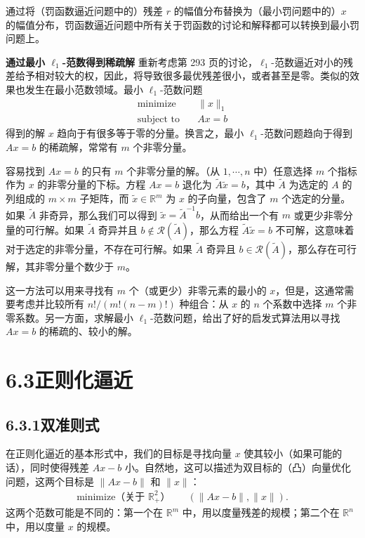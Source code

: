 \documentclass[UTF8,12pt,a4paper,fontset=fandol]{ctexart}
\begin{document}
通过将（罚函数逼近问题中的）残差 $r$ 的幅值分布替换为（最小罚问题中的）$x$ 的幅值分布，罚函数逼近问题中所有关于罚函数的讨论和解释都可以转换到最小罚问题上。

\noindent\textbf{通过最小 $\ell_1$-范数得到稀疏解}\quad
重新考虑第 293 页的讨论，$\ell_1$-范数逼近对小的残差给予相对较大的权，因此，将导致很多最优残差很小，或者甚至是零。类似的效果也发生在最小范数领域。最小 $\ell_1$-范数问题
\[
\begin{aligned}
\text{minimize}\quad & \|x\|_1\\
\text{subject to}\quad & Ax=b
\end{aligned}
\]
得到的解 $x$ 趋向于有很多等于零的分量。换言之，最小 $\ell_1$-范数问题趋向于得到 $Ax=b$ 的稀疏解，常常有 $m$ 个非零分量。

容易找到 $Ax=b$ 的只有 $m$ 个非零分量的解。（从 $1,\cdots,n$ 中）任意选择 $m$ 个指标作为 $x$ 的非零分量的下标。方程 $Ax=b$ 退化为 $\tilde{A}\tilde{x}=b$，其中 $\tilde{A}$ 为选定的 $A$ 的列组成的 $m\times m$ 子矩阵，而 $\tilde{x}\in\mathbb{R}^m$ 为 $x$ 的子向量，包含了 $m$ 个选定的分量。如果 $\tilde{A}$ 非奇异，那么我们可以得到 $\tilde{x}=\tilde{A}^{-1}b$，从而给出一个有 $m$ 或更少非零分量的可行解。如果 $\tilde{A}$ 奇异并且 $b\notin\mathcal{R}(\tilde{A})$，那么方程 $\tilde{A}\tilde{x}=b$ 不可解，这意味着对于选定的非零分量，不存在可行解。如果 $\tilde{A}$ 奇异且 $b\in\mathcal{R}(\tilde{A})$，那么存在可行解，其非零分量个数少于 $m$。

这一方法可以用来寻找有 $m$ 个（或更少）非零元素的最小的 $x$，但是，这通常需要考虑并比较所有 $n!/(m!(n-m)!)$ 种组合：从 $x$ 的 $n$ 个系数中选择 $m$ 个非零系数。另一方面，求解最小 $\ell_1$-范数问题，给出了好的启发式算法用以寻找 $Ax=b$ 的稀疏的、较小的解。

\section*{6.3\quad 正则化逼近}

\subsection*{6.3.1\quad 双准则式}

在正则化逼近的基本形式中，我们的目标是寻找向量 $x$ 使其较小（如果可能的话），同时使得残差 $Ax-b$ 小。自然地，这可以描述为双目标的（凸）向量优化问题，这两个目标是 $\|Ax-b\|$ 和 $\|x\|$：
\begin{equation}
\begin{aligned}
\text{minimize（关于 $\mathbb{R}_+^2$）}\quad & (\|Ax-b\|,\|x\|).
\end{aligned}
\tag{6.7}
\end{equation}
这两个范数可能是不同的：第一个在 $\mathbb{R}^m$ 中，用以度量残差的规模；第二个在 $\mathbb{R}^n$ 中，用以度量 $x$ 的规模。
\end{document}
